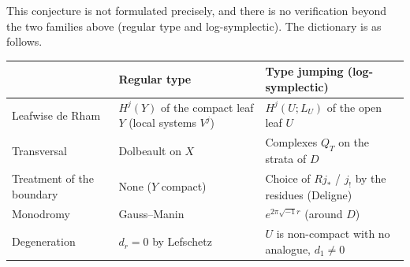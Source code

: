 \noindent This conjecture is not formulated precisely, and there is no verification beyond the two families above (regular type and log-symplectic). The dictionary is as follows.
\begin{center}\small
\begin{tabular}{>{\raggedright\arraybackslash}p{3.0cm}>{\raggedright\arraybackslash}p{5.4cm}>{\raggedright\arraybackslash}p{5.6cm}}\toprule
 & Regular type & Type jumping (log-symplectic)\\\midrule
Leafwise de Rham & $H^j(Y)$ of the compact leaf $Y$ (local systems $V^j$) & $H^j(U;L_U)$ of the open leaf $U$\\\midrule
Transversal & Dolbeault on $X$ & Complexes $Q_T$ on the strata of $D$\\\midrule
Treatment of the boundary & None ($Y$ compact) & Choice of $Rj_*$ / $j_!$ by the residues (Deligne)\\\midrule
Monodromy & Gauss--Manin & $e^{2\pi\sqrt{-1}r}$ (around $D$)\\\midrule
Degeneration & $d_r=0$ by Lefschetz & $U$ is non-compact with no analogue, $d_1\ne0$\\\bottomrule
\end{tabular}
\end{center}
